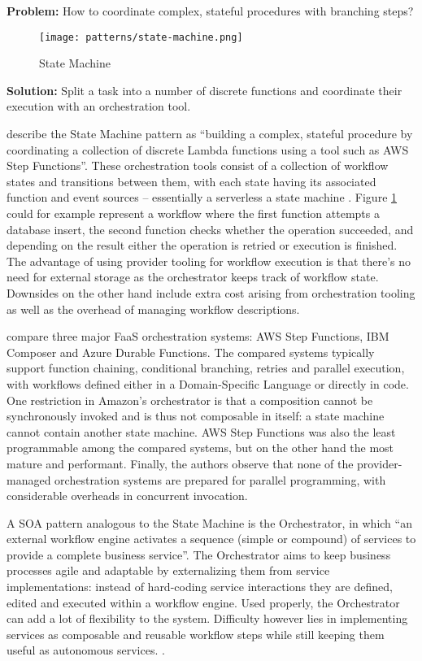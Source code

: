 \textbf{Problem:} How to coordinate complex, stateful procedures with branching steps?

\begin{figure}[h]
  \centering
  \texttt{[image: patterns/state-machine.png]}
  \caption{State Machine}
  \label{fig:patternStateMachine}
\end{figure}

\textbf{Solution:} Split a task into a number of discrete functions and coordinate their execution with an orchestration tool.

\textcite{hong18securingviaserverlesspatterns} describe the State Machine pattern as ``building a complex, stateful procedure by coordinating a collection of discrete Lambda functions using a tool such as AWS Step Functions''. These orchestration tools consist of a collection of workflow states and transitions between them, with each state having its associated function and event sources -- essentially a serverless a state machine \parencite{cncf18serverlessWG}. Figure \ref{fig:patternStateMachine} could for example represent a workflow where the first function attempts a database insert, the second function checks whether the operation succeeded, and depending on the result either the operation is retried or execution is finished. The advantage of using provider tooling for workflow execution is that there's no need for external storage as the orchestrator keeps track of workflow state. Downsides on the other hand include extra cost arising from orchestration tooling as well as the overhead of managing workflow descriptions.

\textcite{lopez18orchestration} compare three major FaaS orchestration systems: AWS Step Functions, IBM Composer and Azure Durable Functions. The compared systems typically support function chaining, conditional branching, retries and parallel execution, with workflows defined either in a Domain-Specific Language or directly in code. One restriction in Amazon's orchestrator is that a composition cannot be synchronously invoked and is thus not composable in itself: a state machine cannot contain another state machine. AWS Step Functions was also the least programmable among the compared systems, but on the other hand the most mature and performant. Finally, the authors observe that none of the provider-managed orchestration systems are prepared for parallel programming, with considerable overheads in concurrent invocation.

A SOA pattern analogous to the State Machine is the Orchestrator, in which ``an external workflow engine activates a sequence (simple or compound) of services to provide a complete business service''. The Orchestrator aims to keep business processes agile and adaptable by externalizing them from service implementations: instead of hard-coding service interactions they are defined, edited and executed within a workflow engine. Used properly, the Orchestrator can add a lot of flexibility to the system. Difficulty however lies in implementing services as composable and reusable workflow steps while still keeping them useful as autonomous services. \parencite{rotem12soa}.

